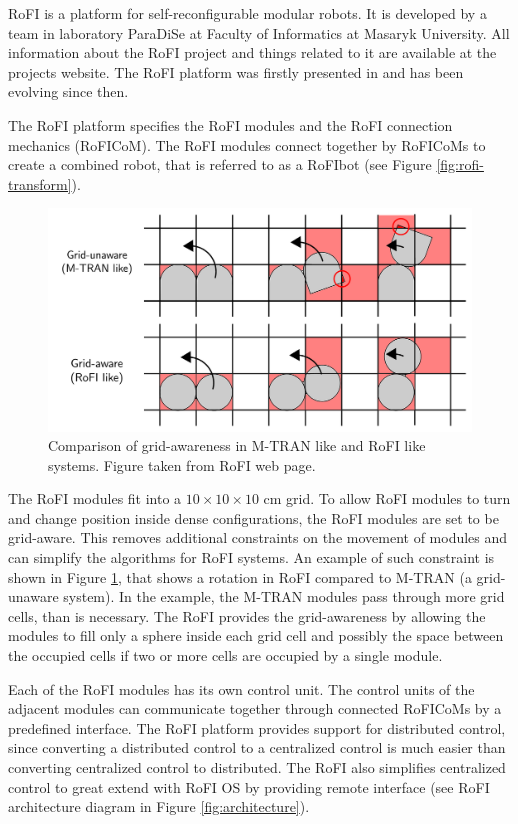 \documentclass[
  digital, %
  table,   %
  oneside, %
  nolof,     %
  nolot,     %
]{fithesis3}
\begin{document}
RoFI is a platform for self-reconfigurable modular robots.
It is developed by a team in laboratory ParaDiSe\cite{paradise-web} at Faculty of Informatics at Masaryk University.
All information about the RoFI project and things related to it are available at the projects website\cite{rofi-web}.
The RoFI platform was firstly presented in \cite{rofi-thesis} and has been evolving since then.

The RoFI platform specifies the RoFI modules and the RoFI connection mechanics (RoFICoM).
The RoFI modules connect together by RoFICoMs to create a combined robot, that is referred to as a RoFIbot\label{rofibot} (see Figure \ref{fig:rofi-transform}).

\begin{figure}
    \centering
    \includegraphics[width=\linewidth]{data/grid_aware.pdf}
    \caption{Comparison of grid-awareness in M-TRAN like and RoFI like systems. Figure taken from RoFI web page\cite{rofi-web}.}
    \label{fig:grid-aware}
\end{figure}

The RoFI modules fit into a $10 \times 10 \times 10$ cm grid.
To allow RoFI modules to turn and change position inside dense configurations, the RoFI modules are set to be grid-aware.
This removes additional constraints on the movement of modules and can simplify the algorithms for RoFI systems.
An example of such constraint is shown in Figure \ref{fig:grid-aware}, that shows a rotation in RoFI compared to M-TRAN\cite{mtran} (a grid-unaware system).
In the example, the M-TRAN modules pass through more grid cells, than is necessary.
The RoFI provides the grid-awareness by allowing the modules to fill only a sphere inside each grid cell and possibly the space between the occupied cells if two or more cells are occupied by a single module.

Each of the RoFI modules has its own control unit.
The control units of the adjacent modules can communicate together through connected RoFICoMs by a predefined interface.
The RoFI platform provides support for distributed control, since converting a distributed control to a centralized control is much easier than converting centralized control to distributed.
The RoFI also simplifies centralized control to great extend with RoFI OS by providing remote interface (see RoFI architecture diagram in Figure \ref{fig:architecture}).
\end{document}

